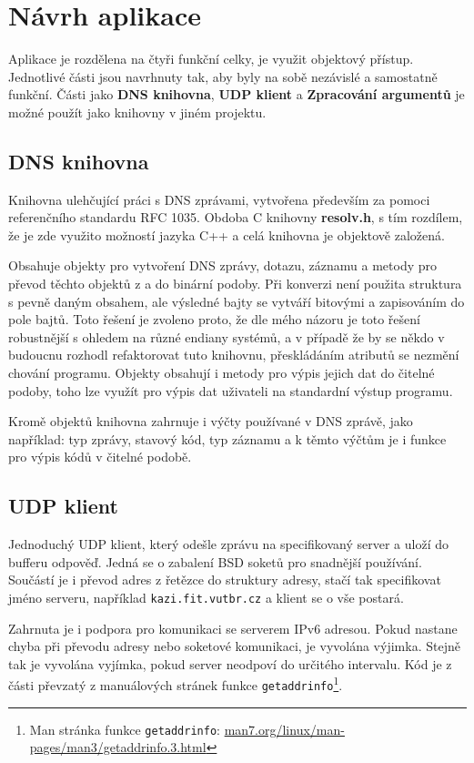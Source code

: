 \documentclass[a4paper,12pt]{article}
\begin{document}
\newpage
\section{Návrh aplikace}
Aplikace je rozdělena na čtyři funkční celky, je využit objektový přístup. Jednotlivé části jsou navrhnuty tak, aby byly na sobě nezávislé a samostatně funkční. Části jako \textbf{DNS knihovna}, \textbf{UDP klient} a \textbf{Zpracování argumentů} je možné použít jako knihovny v jiném projektu.



\subsection{DNS knihovna}
Knihovna ulehčující práci s DNS zprávami, vytvořena především za pomoci referenčního standardu RFC 1035. Obdoba C knihovny \textbf{resolv.h}, s tím rozdílem, že je zde využito možností jazyka C++ a celá knihovna je objektově založená.

Obsahuje objekty pro vytvoření DNS zprávy, dotazu, záznamu a metody pro převod těchto objektů z a do binární podoby. Při konverzi není použita struktura s pevně daným obsahem, ale výsledné bajty se vytváří bitovými a zapisováním do pole bajtů. Toto řešení je zvoleno proto, že dle mého názoru je toto řešení robustnější s ohledem na různé endiany systémů, a v případě že by se někdo v budoucnu rozhodl refaktorovat tuto knihovnu, přeskládáním atributů se nezmění chování programu. Objekty obsahují i metody pro výpis jejich dat do čitelné podoby, toho lze využít pro výpis dat uživateli na standardní výstup programu.

Kromě objektů knihovna zahrnuje i výčty používané v DNS zprávě, jako například: typ zprávy, stavový kód, typ záznamu a k těmto výčtům je i funkce pro výpis kódů v čitelné podobě.

\subsection{UDP klient}
Jednoduchý UDP klient, který odešle zprávu na specifikovaný server a uloží do bufferu odpověď. Jedná se o zabalení BSD soketů pro snadnější používání. Součástí je i převod adres z řetězce do struktury adresy, stačí tak specifikovat jméno serveru, například \texttt{kazi.fit.vutbr.cz} a klient se o vše postará. 

Zahrnuta je i podpora pro komunikaci se serverem IPv6 adresou. Pokud nastane chyba při převodu adresy nebo soketové komunikaci, je vyvolána výjimka. Stejně tak je vyvolána vyjímka, pokud server neodpoví do určitého intervalu. Kód je z části převzatý z manuálových stránek  funkce \texttt{getaddrinfo}\footnote{Man stránka funkce \texttt{getaddrinfo}: \url{man7.org/linux/man-pages/man3/getaddrinfo.3.html}}.
\end{document}
